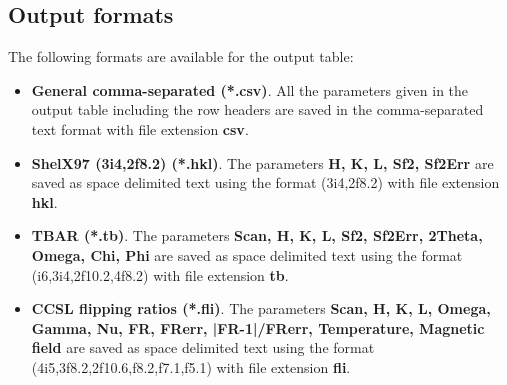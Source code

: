 \newpage
\subsection{Output formats}

The following formats are available for the output table:

\begin{itemize}
	\item \textbf{General comma-separated (*.csv)}. All the parameters given in the output table including the row headers are saved in the comma-separated text format with file extension \textbf{csv}.
	\item \textbf{ShelX97 (3i4,2f8.2) (*.hkl)}. The parameters \textbf{H, K, L, Sf2, Sf2Err} are saved as space delimited text using the format (3i4,2f8.2) with file extension \textbf{hkl}.
	\item \textbf{TBAR (*.tb)}. The parameters \textbf{Scan, H, K, L, Sf2, Sf2Err, 2Theta, Omega, Chi, Phi} are saved as space delimited text using the format (i6,3i4,2f10.2,4f8.2) with file extension \textbf{tb}.
	\item \textbf{CCSL flipping ratios (*.fli)}. The parameters \textbf{Scan, H, K, L, Omega, Gamma, Nu, FR, FRerr, |FR-1|/FRerr, Temperature, Magnetic field} are saved as space delimited text using the format (4i5,3f8.2,2f10.6,f8.2,f7.1,f5.1) with file extension \textbf{fli}.
\end{itemize}



